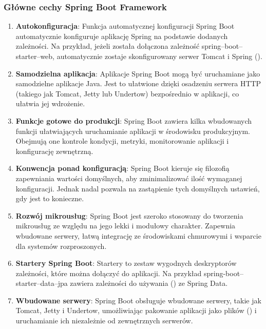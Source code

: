 \subsubsection{Główne cechy Spring Boot Framework}

\begin{enumerate}
    \item \textbf{Autokonfiguracja}: Funkcja automatycznej konfiguracji Spring Boot automatycznie konfiguruje aplikację Spring na podstawie dodanych zależności. Na przykład, jeżeli została dołączona zależność spring--boot--starter--web, automatycznie zostaje skonfigurowany serwer Tomcat i Spring  ()\cite{springbootFeatures}.
    \item \textbf{Samodzielna aplikacja}: Aplikacje Spring Boot mogą być uruchamiane jako samodzielne aplikacje Java. Jest to ułatwione dzięki osadzeniu serwera HTTP (takiego jak Tomcat, Jetty lub Undertow) bezpośrednio w aplikacji, co ułatwia jej wdrożenie\cite{springbootFeatures}.
    \item \textbf{Funkcje gotowe do produkcji}: Spring Boot zawiera kilka wbudowanych funkcji ułatwiających uruchamianie aplikacji w środowisku produkcyjnym. Obejmują one kontrole kondycji, metryki, monitorowanie aplikacji i konfigurację zewnętrzną\cite{springbootFeatures}.
    \item \textbf{Konwencja ponad konfiguracją}: Spring Boot kieruje się filozofią zapewniania wartości domyślnych, aby zminimalizować ilość wymaganej konfiguracji. Jednak nadal pozwala na zastąpienie tych domyślnych ustawień, gdy jest to konieczne\cite{springbootFeatures}.
    \item \textbf{Rozwój mikrousług}: Spring Boot jest szeroko stosowany do tworzenia mikrousług ze względu na jego lekki i modułowy charakter. Zapewnia wbudowane serwery, łatwą integrację ze środowiskami chmurowymi i wsparcie dla systemów rozproszonych\cite{springbootFeatures}.
    \item \textbf{Startery Spring Boot}: Startery to zestaw wygodnych deskryptorów zależności, które można dołączyć do aplikacji. Na przykład spring-boot--starter--data--jpa zawiera zależności do używania  () ze Spring Data\cite{springbootFeatures}.
    \item \textbf{Wbudowane serwery}: Spring Boot obsługuje wbudowane serwery, takie jak Tomcat, Jetty i Undertow, umożliwiając pakowanie aplikacji jako plików  () i uruchamianie ich niezależnie od zewnętrznych serwerów\cite{springbootFeatures}.

\end{enumerate}
